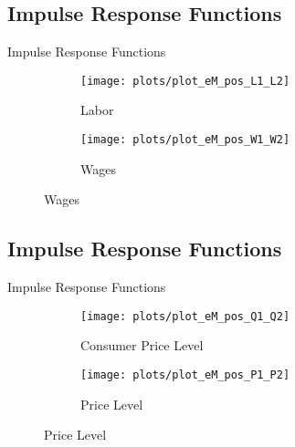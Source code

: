 \documentclass[../quali_slides.tex]{subfiles}
\begin{document}

\subsection{Impulse Response Functions}

\begin{frame}{Impulse Response Functions}
	
	\begin{figure}[h!]
		\centering
		\begin{subfigure}[b]{0.45\textwidth}
			\centering
			\texttt{[image: plots/plot\_eM\_pos\_L1\_L2]}
			\caption{\scriptsize Labor}
			\label{fig:plot_eM_pos_L1_L2}
		\end{subfigure}
		\hspace*{0.3cm}
		\begin{subfigure}[b]{0.45\textwidth}
			\centering
			\texttt{[image: plots/plot\_eM\_pos\_W1\_W2]}
			\caption{\scriptsize Wages}
			\label{fig:plot_eM_pos_W1_W2}
		\end{subfigure}
	\end{figure}
	
\end{frame}


\subsection{Impulse Response Functions}

\begin{frame}{Impulse Response Functions}
	
	\begin{figure}[h!]
		\centering
		\begin{subfigure}[b]{0.45\textwidth}
			\centering
			\texttt{[image: plots/plot\_eM\_pos\_Q1\_Q2]}
			\caption{\scriptsize Consumer Price Level}
			\label{fig:plot_eM_pos_Q1_Q2}
		\end{subfigure}
		\hspace*{0.3cm}
		\begin{subfigure}[b]{0.45\textwidth}
			\centering
			\texttt{[image: plots/plot\_eM\_pos\_P1\_P2]}
			\caption{\scriptsize Price Level}
			\label{fig:plot_eM_pos_P1_P2}
		\end{subfigure}
	\end{figure}
	
\end{frame}
\end{document}
